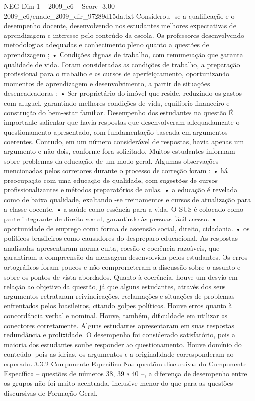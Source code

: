 \begin{textsample}{NEG Dim 1 – 2009\_c6 – Score -3.00 – 2009\_c6/enade\_2009\_dir\_97289d15da.txt}
Considerou -se a qualificação e o desempenho docente, desenvolvendo nos estudantes melhores expectativas de aprendizagem e interesse pelo conteúdo da escola.
Os professores desenvolvendo metodologias adequadas e conhecimento pleno quanto a questões de aprendizagem ; • Condições dignas de trabalho, com remuneração que garanta qualidade de vida.
Foram consideradas as condições de trabalho, a preparação profissional para o trabalho e os cursos de aperfeiçoamento, oportunizando momentos de aprendizagem e desenvolvimento, a partir de situações desencadeadoras ; • Ser proprietário do imóvel que reside, reduzindo os gastos com aluguel, garantindo melhores condições de vida, equilíbrio financeiro e construção do bem-estar familiar.
Desempenho dos estudantes na questão É importante salientar que havia respostas que desenvolveram adequadamente o questionamento apresentado, com fundamentação baseada em argumentos coerentes.
Contudo, em um número considerável de respostas, havia apenas um argumento e não dois, conforme fora solicitado.
Muitos estudantes informam sobre problemas da educação, de um modo geral.
Algumas observações mencionadas pelos corretores durante o processo de correção foram : • há preocupação com uma educação de qualidade, com sugestões de cursos profissionalizantes e métodos preparatórios de aulas. • a educação é revelada como de baixa qualidade, exaltando -se treinamentos e cursos de atualização para a classe docente. • a saúde como essência para a vida.
O SUS é colocado como parte integrante de direito social, garantindo às pessoas fácil acesso. • oportunidade de emprego como forma de ascensão social, direito, cidadania. • os políticos brasileiros como causadores do despreparo educacional.
As respostas analisadas apresentaram norma culta, coesão e coerência razoáveis, que garantiram a compreensão da mensagem desenvolvida pelos estudantes.
Os erros ortográficos foram poucos e não comprometeram a discussão sobre o assunto e sobre os pontos de vista abordados.
Quanto à coerência, houve um desvio em relação ao objetivo da questão, já que alguns estudantes, através dos seus argumentos retrataram reivindicações, reclamações e situações de problemas enfrentados pelos brasileiros, citando golpes políticos.
Houve erros quanto à concordância verbal e nominal.
Houve, também, dificuldade em utilizar os conectores corretamente.
Alguns estudantes apresentaram em suas respostas redundância e prolixidade.
O desempenho foi considerado satisfatório, pois a maioria dos estudantes soube responder ao questionamento.
Houve domínio do conteúdo, pois as ideias, os argumentos e a originalidade corresponderam ao esperado. 3.3.2 Componente Específico Nas questões discursivas do Componente Específico – questões de números 38, 39 e 40 –, a diferença de desempenho entre os grupos não foi muito acentuada, inclusive menor do que para as questões discursivas de Formação Geral.

\end{textsample}
